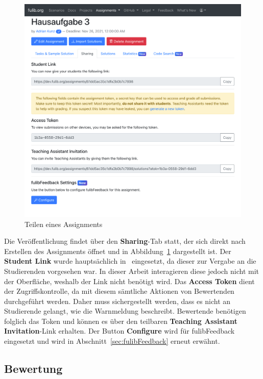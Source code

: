 \begin{figure}
    \centering
    \includegraphics[width=\textwidth]{images/assignment-share}
    \caption{Teilen eines Assignments}
    \label{fig:assignment-share}
\end{figure}

Die Veröffentlichung findet über den \textbf{Sharing}-Tab statt, der sich direkt nach Erstellen des Assignments öffnet und in Abbildung~\ref{fig:assignment-share} dargestellt ist.
Der \textbf{Student Link} wurde hauptsächlich in~\cite{bachelor-thesis} eingesetzt, da dieser zur Vergabe an die Studierenden vorgesehen war.
In dieser Arbeit interagieren diese jedoch nicht mit der Oberfläche, weshalb der Link nicht benötigt wird.
Das \textbf{Access Token} dient der Zugriffskontrolle, da mit diesem sämtliche Aktionen von Bewertenden durchgeführt werden.
Daher muss sichergestellt werden, dass es nicht an Studierende gelangt, wie die Warnmeldung beschreibt.
Bewertende benötigen folglich das Token und können es über den teilbaren \textbf{Teaching Assistant Invitation}-Link erhalten.
Der Button \textbf{Configure} wird für fulibFeedback eingesetzt und wird in Abschnitt~\ref{sec:fulibFeedback} erneut erwähnt.

\subsection{Bewertung}\label{subsec:grading}

